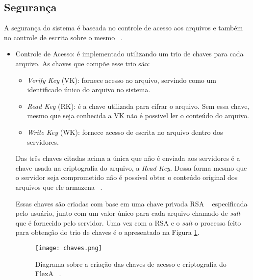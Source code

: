 	 \subsection{Segurança}
	    A segurança do sistema é baseada no controle de acesso aos arquivos e também no controle de escrita sobre o mesmo ~\cite{silas}.
	 
    	 \begin{itemize}
    	 
    	    \item Controle de Acesso: é implementado utilizando um trio de chaves para cada arquivo. As chaves que compõe esse trio são:
        	    \begin{itemize}
        	        \item \textit{Verify Key} (VK): fornece acesso ao arquivo, servindo como um identificado único do arquivo no sistema.
        	        \item \textit{Read Key} (RK): é a chave utilizada para cifrar o arquivo. Sem essa chave, mesmo que seja conhecida a VK não é possivel ler o conteúdo do arquivo.
        	        
        	        \item \textit{Write Key} (WK): fornece acesso de escrita no arquivo dentro dos servidores.
        	    \end{itemize}
        	    
            Das três chaves citadas acima a única que não é enviada aos servidores é a chave usada na criptografia do arquivo, a \textit{Read Key}. Dessa forma mesmo que o servidor seja comprometido não é possível obter o conteúdo original dos arquivos que ele armazena ~\cite{mario}.
        	    
        	    
        	    Essas chaves são criadas com base em uma chave privada RSA ~\cite{shamirRSA} especificada pelo usuário, junto com um valor único para cada arquivo chamado de \textit{salt} que é fornecido pelo servidor. Uma vez com a RSA e o \textit{\textit{salt}} o processo feito para obtenção do trio de chaves é o apresentado na Figura \ref{fig:chavesFlexa}.
        	    
        	    \begin{figure}
        	    \centering
        	    \texttt{[image: chaves.png]}
        	    \caption{Diagrama sobre a criação das chaves de acesso e criptografia do FlexA ~\cite{mario}.}
        	    \label{fig:chavesFlexa}
        	    \end{figure}
        	    

\end{itemize}
